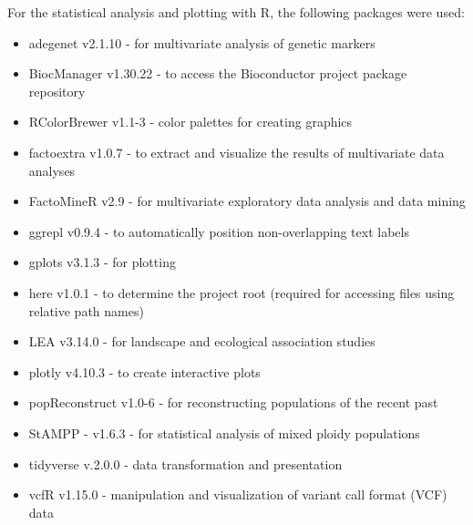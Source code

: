 For the statistical analysis and plotting with R, the following packages were used:
\begin{itemize}
    \item adegenet v2.1.10 - for multivariate analysis of genetic markers
    \item BiocManager v1.30.22 - to access the Bioconductor project package repository
    \item RColorBrewer v1.1-3 - color palettes for creating graphics
    \item factoextra v1.0.7 - to extract and visualize the results of multivariate data analyses
    \item FactoMineR v2.9 - for multivariate exploratory data analysis and data mining
    \item ggrepl v0.9.4 - to automatically position non-overlapping text labels
    \item gplots v3.1.3 - for plotting
    \item here v1.0.1 - to determine the project root (required for accessing files using relative path names)
    \item LEA v3.14.0 - for landscape and ecological association studies
    \item plotly v4.10.3 - to create interactive plots
    \item popReconstruct v1.0-6 - for reconstructing populations of the recent past
    \item StAMPP - v1.6.3 - for statistical analysis of mixed ploidy populations
    \item tidyverse v.2.0.0 - data transformation and presentation
    \item vcfR v1.15.0 - manipulation and visualization of variant call format (VCF) data
\end{itemize}

